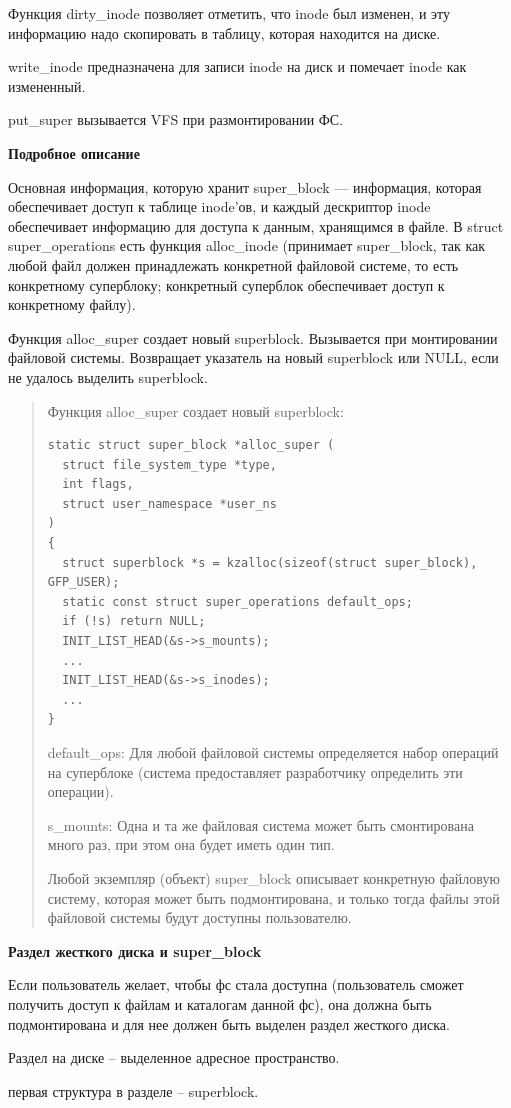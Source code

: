 Функция dirty\_inode позволяет отметить, что inode был изменен, и эту информацию надо скопировать в таблицу, которая находится на диске.

write\_inode предназначена для записи inode на диск и помечает inode как измененный.

put\_super вызывается VFS при размонтировании ФС.

\textbf{Подробное описание}

Основная информация, которую хранит super\_block — информация, которая обеспечивает доступ к таблице inode'ов, и каждый дескриптор inode обеспечивает информацию для доступа к данным, хранящимся в файле. В struct \\ super\_operations есть функция alloc\_inode (принимает super\_block, так как любой файл должен принадлежать конкретной файловой системе, то есть конкретному суперблоку; конкретный суперблок обеспечивает доступ к конкретному файлу).

Функция alloc\_super создает новый superblock. Вызывается при монтировании файловой системы. Возвращает указатель на новый superblock или NULL, если не удалось выделить superblock.

\begin{quote}

Функция alloc\_super создает новый superblock:

\begin{lstlisting}
static struct super_block *alloc_super (
  struct file_system_type *type,
  int flags,
  struct user_namespace *user_ns
)
{
  struct superblock *s = kzalloc(sizeof(struct super_block), GFP_USER);
  static const struct super_operations default_ops;
  if (!s) return NULL;
  INIT_LIST_HEAD(&s->s_mounts);
  ...
  INIT_LIST_HEAD(&s->s_inodes);
  ...
}
\end{lstlisting}

default\_ops: Для любой файловой системы определяется набор операций на суперблоке (система предоставляет разработчику определить эти операции).

s\_mounts: Одна и та же файловая система может быть смонтирована много раз, при этом она будет иметь один тип.

Любой экземпляр (объект) super\_block описывает конкретную файловую систему, которая может быть подмонтирована, и только тогда файлы этой файловой системы будут доступны пользователю.
\end{quote}

\textbf{Раздел жесткого диска и super\_block}
\par Если пользователь желает, чтобы фс стала доступна (пользователь сможет получить доступ к файлам и каталогам данной фс), она должна быть подмонтирована и для нее должен быть выделен раздел жесткого диска.
\par Раздел на диске -- выделенное адресное пространство.
\par первая структура в разделе -- superblock.

